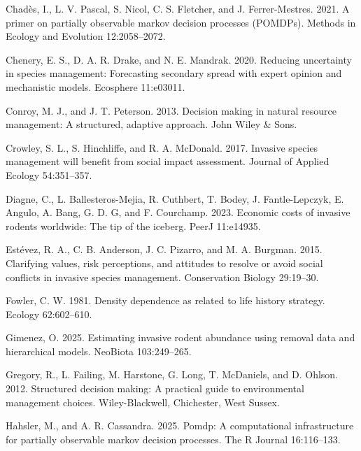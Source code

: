\documentclass[
  11pt,
  a4paper,
]{article}
\newlength{\cslhangindent}
\newenvironment{CSLReferences}[2] %
 {\begin{list}{}{%
  \setlength{\itemindent}{0pt}
  \setlength{\leftmargin}{0pt}
  \setlength{\parsep}{0pt}
  \ifodd #1
   \setlength{\leftmargin}{\cslhangindent}
   \setlength{\itemindent}{-1\cslhangindent}
  \fi
  \setlength{\itemsep}{#2\baselineskip}}}
 {\end{list}}
\begin{document}
\begin{CSLReferences}{1}{0}
Chadès, I., L. V. Pascal, S. Nicol, C. S. Fletcher, and J. Ferrer-Mestres. 2021. A primer on partially observable markov decision processes (POMDPs). Methods in Ecology and Evolution 12:2058--2072.

Chenery, E. S., D. A. R. Drake, and N. E. Mandrak. 2020. Reducing uncertainty in species management: Forecasting secondary spread with expert opinion and mechanistic models. Ecosphere 11:e03011.

Conroy, M. J., and J. T. Peterson. 2013. Decision making in natural resource management: A structured, adaptive approach. John Wiley \& Sons.

Crowley, S. L., S. Hinchliffe, and R. A. McDonald. 2017. Invasive species management will benefit from social impact assessment. Journal of Applied Ecology 54:351--357.

Diagne, C., L. Ballesteros-Mejia, R. Cuthbert, T. Bodey, J. Fantle-Lepczyk, E. Angulo, A. Bang, G. D. G, and F. Courchamp. 2023. Economic costs of invasive rodents worldwide: The tip of the iceberg. PeerJ 11:e14935.

Estévez, R. A., C. B. Anderson, J. C. Pizarro, and M. A. Burgman. 2015. {Clarifying values, risk perceptions, and attitudes to resolve or avoid social conflicts in invasive species management}. Conservation Biology 29:19--30.

Fowler, C. W. 1981. Density dependence as related to life history strategy. Ecology 62:602--610.

Gimenez, O. 2025. Estimating invasive rodent abundance using removal data and hierarchical models. NeoBiota 103:249--265.

Gregory, R., L. Failing, M. Harstone, G. Long, T. McDaniels, and D. Ohlson. 2012. Structured decision making: A practical guide to environmental management choices. Wiley-Blackwell, Chichester, West Sussex.

Hahsler, M., and A. R. Cassandra. 2025. Pomdp: A computational infrastructure for partially observable markov decision processes. The R Journal 16:116--133.


\end{CSLReferences}
\end{document}
